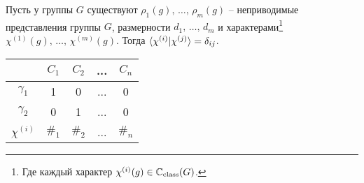 \begin{to_lem}
    Пусть у группы $G$ существуют $\rho_1(g),\, \ldots,\, \rho_m(g)$ -- неприводимые представления группы $G$, размерности $d_1,\, \ldots,\, d_m$
    и характерами\footnote{
    	Где каждый характер $\chi^{(i)} (g) \in \mathbb{C}_{\textnormal{class}} (G)$. 
    }  $\chi^{(1)}(g),\, \ldots,\, \chi^{(m)}(g)$. Тогда $\bk{\chi^{(i)}}{\chi^{(j)}} = \delta_{ij}$. 
\end{to_lem}




\begin{center}
\begin{tabular}{c|cccc}
		&$C_1$ & $C_2$ & ... & $C_n$ \\
		\hline
		$\gamma_1$ & 1 & 0 & ... & 0 \\
		$\gamma_2$ & 0 & 1 & ... & 0 \\
		$\chi^{(i)}$ & $\#_1$ & $\#_2$ & ... & $\#_n$
	\end{tabular}    
\end{center}



% 










% 